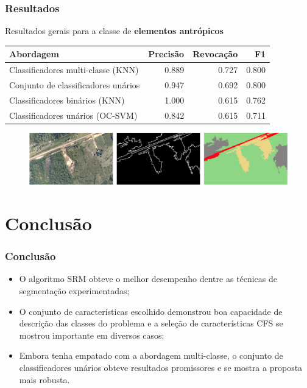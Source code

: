 \documentclass[t]{beamer}
\begin{document}
\begin{frame}[c]
	\frametitle{Resultados}
	
	\centering
	Resultados gerais para a classe de \textbf{elementos antrópicos}

	\small{
		\begin{table}[h]
		\centering
		\begin{tabulary}{\linewidth}{|L|R|R|R|}
		\hline
		\textbf{Abordagem}  & \textbf{Precisão} & \textbf{Revocação} & \textbf{F1} \\ \hline
		Classificadores multi-classe (KNN)   & 0.889 & 0.727 & 0.800 \\ \hline
		Conjunto de classificadores unários  & 0.947 & 0.692 & 0.800 \\ \hline
		Classificadores binários (KNN)       & 1.000 & 0.615 & 0.762 \\ \hline
		Classificadores unários (OC-SVM)     & 0.842 & 0.615 & 0.711 \\ \hline
		\end{tabulary}
		\end{table}
	}

	\begin{figure}
		\includegraphics[width=\textwidth]{imgs/resultado_final}
	\end{figure}
\end{frame}


\section{Conclusão}

\begin{frame}[c]
	\frametitle{Conclusão}

	\begin{itemize}
		\item O algoritmo SRM obteve o melhor desempenho dentre as técnicas de segmentação experimentadas;
		\item O conjunto de características escolhido demonstrou boa capacidade de descrição das classes do problema e a seleção de características CFS se mostrou importante em diversos casos;
		\item Embora tenha empatado com a abordagem multi-classe, o conjunto de classificadores unários obteve resultados promissores e se mostra a proposta mais robusta.
	\end{itemize}
\end{frame}
\end{document}
